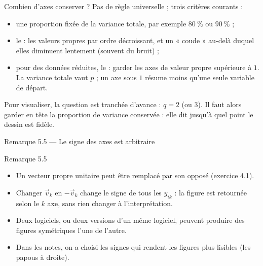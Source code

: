 \begin{frame}{Combien d'axes conserver ?}
  Pas de règle universelle ; trois critères courants :
  \begin{itemize}
    \item une proportion fixée de la variance totale, par exemple
      $\SI{80}{\percent}$ ou $\SI{90}{\percent}$ ;
    \item le  : les valeurs propres par ordre
      décroissant, et un « coude » au-delà duquel elles diminuent lentement
      (souvent du bruit) ;
    \item pour des données réduites, le  : garder les
      axes de valeur propre supérieure à $1$. La variance totale vaut $p$ ;
      un axe sous $1$ résume moins qu'une seule variable de départ.
  \end{itemize}
  \vspace{4pt}
  Pour visualiser, la question est tranchée d'avance : $q=2$ (ou $3$). Il
  faut alors garder en tête la proportion de variance conservée : elle dit
  jusqu'à quel point le dessin est fidèle.
\end{frame}

\begin{frame}{Remarque 5.5 --- Le signe des axes est arbitraire}
  \begin{Rem}{Remarque 5.5}
    \begin{itemize}
      \item Un vecteur propre unitaire peut être remplacé par son opposé
        (exercice 4.1).
      \item Changer $\vec v_k$ en $-\vec v_k$ change le signe de tous les
        $y_{ik}$ : la figure est retournée selon le $k$ axe, sans rien
        changer à l'interprétation.
      \item Deux logiciels, ou deux versions d'un même logiciel, peuvent
        produire des figures symétriques l'une de l'autre.
      \item Dans les notes, on a choisi les signes qui rendent les figures
        plus lisibles (les papous à droite).
    \end{itemize}
  \end{Rem}
\end{frame}

